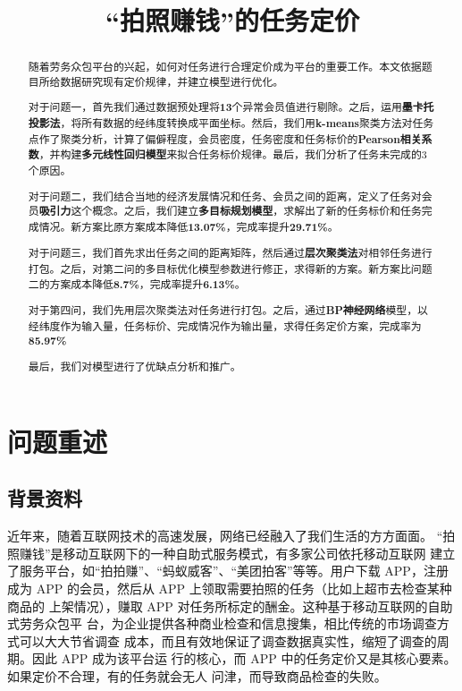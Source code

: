 \documentclass[withoutpreface,bwprint]{cumcmthesis} %
\title{“拍照赚钱”的任务定价}
\begin{document}
 \maketitle
 \begin{abstract}

随着劳务众包平台的兴起，如何对任务进行合理定价成为平台的重要工作。本文依据题目所给数据研究现有定价规律，并建立模型进行优化。

对于问题一，首先我们通过数据预处理将\textbf{13}个异常会员值进行剔除。之后，运用\textbf{墨卡托投影法}，将所有数据的经纬度转换成平面坐标。然后，我们用\textbf{k-means}聚类方法对任务点作了聚类分析，计算了偏僻程度，会员密度，任务密度和任务标价的\textbf{Pearson相关系数}，并构建\textbf{多元线性回归模型}来拟合任务标价规律。最后，我们分析了任务未完成的3个原因。

对于问题二，我们结合当地的经济发展情况和任务、会员之间的距离，定义了任务对会员\textbf{吸引力}这个概念。之后，我们建立\textbf{多目标规划模型}，求解出了新的任务标价和任务完成情况。新方案比原方案成本降低\textbf{13.07\%}，完成率提升\textbf{29.71\%}。

对于问题三，我们首先求出任务之间的距离矩阵，然后通过\textbf{层次聚类法}对相邻任务进行打包。之后，对第二问的多目标优化模型参数进行修正，求得新的方案。新方案比问题二的方案成本降低\textbf{8.7\%}，完成率提升\textbf{6.13\%}。

对于第四问，我们先用层次聚类法对任务进行打包。之后，通过\textbf{BP神经网络}模型，以经纬度作为输入量，任务标价、完成情况作为输出量，求得任务定价方案，完成率为\textbf{85.97\%}

最后，我们对模型进行了优缺点分析和推广。


\end{abstract}

\tableofcontents


\section{问题重述}

\subsection{背景资料}

近年来，随着互联网技术的高速发展，网络已经融入了我们生活的方方面面。
“拍照赚钱”是移动互联网下的一种自助式服务模式，有多家公司依托移动互联网
建立了服务平台，如“拍拍赚”、“蚂蚁威客”、“美团拍客”等等。用户下载 APP，注册
成为 APP 的会员，然后从 APP 上领取需要拍照的任务（比如上超市去检查某种商品的
上架情况），赚取 APP 对任务所标定的酬金。这种基于移动互联网的自助式劳务众包平
台，为企业提供各种商业检查和信息搜集，相比传统的市场调查方式可以大大节省调查
成本，而且有效地保证了调查数据真实性，缩短了调查的周期。因此 APP 成为该平台运
行的核心，而 APP 中的任务定价又是其核心要素。如果定价不合理，有的任务就会无人
问津，而导致商品检查的失败。
\end{document}
